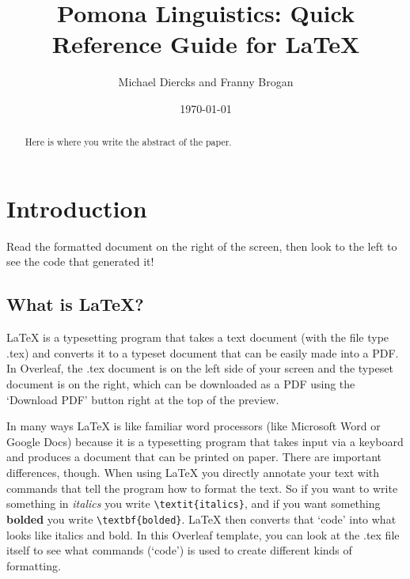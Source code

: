 \documentclass{article}
\title{Pomona Linguistics: Quick Reference Guide for LaTeX}
\author{Michael Diercks and Franny Brogan}
\date{\today}
\begin{document}
\maketitle

\begin{abstract}

Here is where you write the abstract of the paper.

\end{abstract}

\vspace{-5mm} %



\tableofcontents

\section{Introduction}

Read the formatted document on the right of the screen, then look to the left to see the code that generated it! %

\subsection{What is \LaTeX?}

\LaTeX{} is a typesetting program that takes a text document (with the file type .tex) and converts it to a typeset document that can be easily made into a PDF. In Overleaf, the .tex document is on the left side of your screen and the typeset document is on the right, which can be downloaded as a PDF using the `Download PDF' button  right at the top of the preview.

In many ways \LaTeX{} is like familiar word processors (like Microsoft Word or Google Docs) because it is a typesetting program that takes input via a keyboard and produces a document that can be printed on paper. There are important differences, though. When using \LaTeX{} you directly annotate your text with commands that tell the program how to format the text. So if you want to write something in \textit{italics} you write \verb|\textit{italics}|, and if you want something \textbf{bolded} you write \verb|\textbf{bolded}|. \LaTeX{} then converts that `code' into what looks like italics and bold. In this Overleaf template, you can look at the .tex file itself to see what commands (`code') is used to create different kinds of formatting. 
\end{document}
